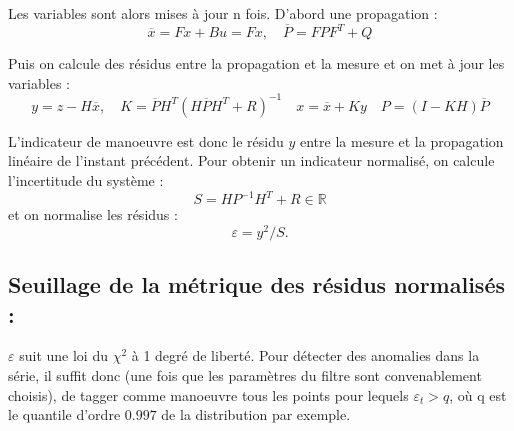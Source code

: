 \documentclass{article}
\begin{document}
Les variables sont alors mises à jour n fois.
D'abord une propagation : 
\[
\overline{x} = Fx + Bu = Fx, \quad
\overline{P} = F P F^T + Q
\] 

Puis on calcule des résidus entre la propagation et la mesure et on met à jour les variables :
\[
y = z - H \overline{x}, \quad 
K =  \overline{P} H ^ T (H \overline{P} H ^T + R)^ {-1} \quad
x = \overline{x} + K y \quad
P = (I - K H) \overline{P}
\]

L'indicateur de manoeuvre est donc le résidu $y$ entre la mesure et la propagation linéaire de l'instant précédent.
Pour obtenir un indicateur normalisé, on calcule l'incertitude du système : 
\[
S = H P ^ {-1} H ^ T + R \in \mathbb{R}
\]
et on normalise les résidus : 
\[
\varepsilon = y ^2 / S. 
\]

\subsection{Seuillage de la métrique des résidus normalisés :}

$\varepsilon$ suit une loi du $\chi ^ 2 $ à 1 degré de liberté. Pour détecter des anomalies dans la série, il suffit donc (une fois que les paramètres du filtre sont convenablement choisis), de tagger comme manoeuvre tous les points pour lequels $\varepsilon_t > q $, où q est le quantile d'ordre $0.997$ de la distribution par exemple. 

\vspace{0.3cm}
\noindent{}
\end{document}
